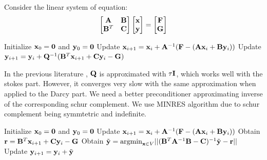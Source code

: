 Consider the linear system of equation:
\begin{equation}
\begin{bmatrix}
		  \bold{A}   & \bold{B} \\
		  \bold{B}^T & \bold{C}
\end{bmatrix} \begin{bmatrix}
\bold{x} \\ \bold{y}
\end{bmatrix} = \begin{bmatrix}
		  \bold{F} \\
		  \bold{G}
\end{bmatrix}
\end{equation}

\begin{algorithm}
\caption{Preconditioned Inexact Uzawa Iteration}
		  \begin{algorithmic}[1]
					 \State Initialize $\bold{x}_0 = \bold{0}$ and $\bold{y}_0 = \bold{0}$
					 \State Update $\bold{x}_{i+1} = \bold{x}_i + \bold{A}^{-1} (\bold{F} - (\bold{A}\bold{x}_i + \bold{B}\bold{y}_i))$
					 \State Update $\bold{y}_{i+1} = \bold{y}_i + \bold{Q}^{-1} ( \bold{B}^T\bold{x}_{i+1} + \bold{C}\bold{y}_{i} - \bold{G})$
\end{algorithmic}
\end{algorithm}

In the previous literature \cite{AnalysisInexactUzawa_Bramble_Pasciak_Vassilev}, 
$\bold{Q}$ is approximated with $\tau \bold{I}$, which works well with the 
stokes part. However, it converges very slow with the same approximation when 
applied to the Darcy part. We need a better preconditioner approximating 
inverse of the corresponding schur complement.
We use MINRES algorithm \cite{SolSparseIndef_Paige_Saunders} due to schur 
complement being symmtetric and indefinite.

\begin{algorithm}
\caption{Preconditioned Inexact Uzawa Iteration}
		  \begin{algorithmic}[1]
					 \State Initialize $\bold{x}_0 = \bold{0}$ and $\bold{y}_0 = \bold{0}$
					 \State Update $\bold{x}_{i+1} = \bold{x}_i + \bold{A}^{-1} (\bold{F} - (\bold{A}\bold{x}_i + \bold{B}\bold{y}_i))$
					 \State Obtain $\bold{r} = \bold{B}^T\bold{x}_{i+1} + \bold{C}\bold{y}_{i} - \bold{G}$
					 \State Obtain $\tilde{\bold{y}} =\text{argmin}_{\bold{x}\in V} ||(\bold{B}^T\bold{A}^{-1}\bold{B} - \bold{C})^{-1}\tilde{\bold{y}}-\bold{r} ||$
					 \State Update $\bold{y}_{i+1} = \bold{y}_i + \tilde{\bold{y}}$
\end{algorithmic}
\end{algorithm}

